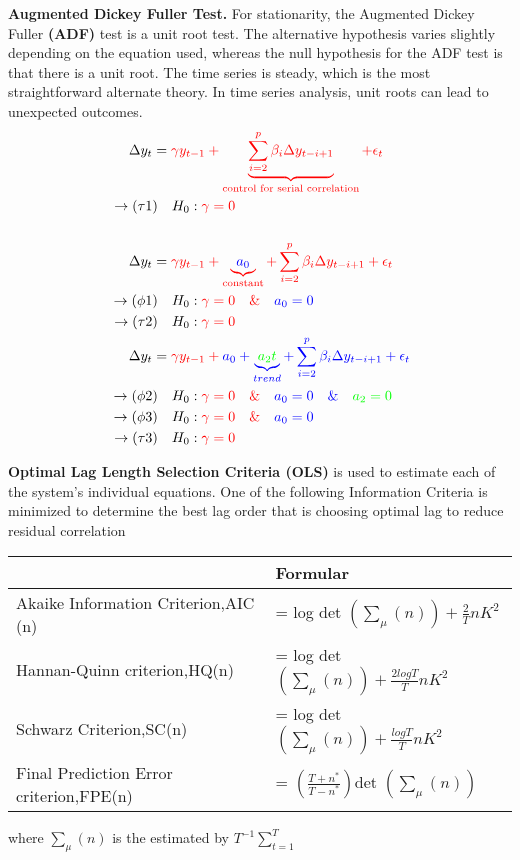 \textbf{Augmented Dickey Fuller Test.} For stationarity, the Augmented Dickey Fuller \textbf{(ADF)} test is a unit root test. The alternative hypothesis varies slightly depending on the equation used, whereas the null hypothesis for the ADF test is that there is a unit root. The time series is steady, which is the most straightforward alternate theory. In time series analysis, unit roots can lead to unexpected outcomes.
\begin{align}        \Delta y_t &=  \color{red}\gamma y_{t-1} + \underbrace{\sum_{i=2}^{p} \beta_i \Delta y_{t-i+1}}_\text{control for serial correlation} + \epsilon_t  \\ \rightarrow (\tau1&)\quad H_0 : \color{red} {\gamma = 0} \\\\       \Delta y_t &=  \color{red}{\gamma} y_{t-1}  + \underbrace{\color{blue}{a_0}}_\text{constant} + \sum_{i=2}^{p} \beta_i \Delta y_{t-i+1} + \epsilon_t   \\ \rightarrow (\phi1&)\quad H_0 : \color{red} {\gamma = 0} \quad\&\quad\color{blue}{a_0 = 0}  \\\ \rightarrow (\tau2&)\quad H_0 : \color{red} {\gamma = 0}  \\\       \Delta y_t &=  \color{red}{\gamma} y_{t-1}  + \color{blue}{a_0}  + \underbrace{\color{green}{a_2} t}_{trend} + \sum_{i=2}^{p} \beta_i \Delta y_{t-i+1}  + \epsilon_t \\ \rightarrow (\phi2&)\quad H_0 : \color{red} {\gamma = 0} \quad\&\quad \color{blue}{a_0 = 0} \quad\&\quad \color{green}{a_2 = 0} \\ \rightarrow (\phi3&)\quad H_0 : \color{red} {\gamma = 0} \quad\&\quad\color{blue}{a_0 = 0}  \\ \rightarrow (\tau3&)\quad H_0 : \color{red} {\gamma = 0}    
 \end{align}

\textbf{Optimal Lag Length Selection Criteria (OLS)}  is used to estimate each of the system's individual equations. One of the following Information Criteria is minimized to determine the best lag order that is choosing optimal lag  to reduce residual correlation
\begin{center}
		\begin{tabular}{ll}
			\multicolumn{1}{c}{}Criteria &  Formular \\ \midrule
			Akaike Information Criterion,AIC (n)  & = log det $ \displaystyle\left(\sum _{\mu}(n)\right)+ \frac{2}{T}nK^{2}$\\
			Hannan-Quinn criterion,HQ(n)    & = log det  $ \displaystyle\left(\sum _{\mu}(n)\right)+ \frac{2logT}{T}nK^{2}$\\
			Schwarz Criterion,SC(n)    & = log det  $ \displaystyle\left(\sum _{\mu}(n)\right)+ \frac{logT}{T}nK^{2}$\\
			Final Prediction Error criterion,FPE(n)   & =          $\displaystyle \left(\frac{T + n^{*}}{T - n^{*}}\right)$det $\displaystyle \left(\sum_{\mu}(n)\right)$\\ \bottomrule
		\end{tabular}
\end{center}
where $ \displaystyle \sum_{\mu} (n)$ is the estimated by $T^{-1}\sum_{t=1}^{T}$
